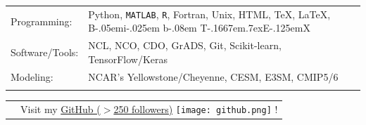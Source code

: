 \documentclass[margin,line,palatino,courier,10pt]{res}
\def\BibTeX{{\rm B\kern-.05em{\sc i\kern-.025em b}\kern-.08em
    T\kern-.1667em\lower.7ex\hbox{E}\kern-.125emX}}
\begin{document}
\begin{resume}
\begin{tabular}{@{}p{0.9in}p{6in}}
Programming: & Python, \texttt{MATLAB}, \texttt{R}, Fortran, Unix, HTML, \TeX, \LaTeX, \BibTeX \\
Software/Tools: & NCL, NCO, CDO, GrADS, Git, Scikit-learn, TensorFlow/Keras\\
Modeling: & NCAR's Yellowstone/Cheyenne, CESM, E3SM, CMIP5/6\\\\
\end{tabular}
\begin{tabular}{@{}p{0.9in}p{6in}}
& Visit my \href{https://github.com/zmlabe}{GitHub ($>$250 followers)} \texttt{[image: github.png]} !\\
\end{tabular}

\vspace{-0.1in}
\noindent\textcolor{MidnightBlue}{\makebox[\linewidth][r]{\rule{\textwidth}{5pt}}}
\vspace{-0.3in}


\end{resume}
\end{document}
